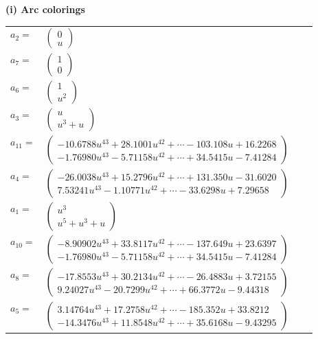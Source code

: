 \documentclass[1p]{elsarticle_modified}
\theoremstyle{definition}
\begin{document}
\flushleft \textbf{(i) Arc colorings}\\
\begin{tabular}{m{7pt} m{180pt} m{7pt} m{180pt} }
\flushright $a_{2}=$&$\begin{pmatrix}0\\u\end{pmatrix}$ \\
\flushright $a_{7}=$&$\begin{pmatrix}1\\0\end{pmatrix}$ \\
\flushright $a_{6}=$&$\begin{pmatrix}1\\u^2\end{pmatrix}$ \\
\flushright $a_{3}=$&$\begin{pmatrix}u\\u^3+u\end{pmatrix}$ \\
\flushright $a_{11}=$&$\begin{pmatrix}-10.6788 u^{43}+28.1001 u^{42}+\cdots-103.108 u+16.2268\\-1.76980 u^{43}-5.71158 u^{42}+\cdots+34.5415 u-7.41284\end{pmatrix}$ \\
\flushright $a_{4}=$&$\begin{pmatrix}-26.0038 u^{43}+15.2796 u^{42}+\cdots+131.350 u-31.6020\\7.53241 u^{43}-1.10771 u^{42}+\cdots-33.6298 u+7.29658\end{pmatrix}$ \\
\flushright $a_{1}=$&$\begin{pmatrix}u^3\\u^5+u^3+u\end{pmatrix}$ \\
\flushright $a_{10}=$&$\begin{pmatrix}-8.90902 u^{43}+33.8117 u^{42}+\cdots-137.649 u+23.6397\\-1.76980 u^{43}-5.71158 u^{42}+\cdots+34.5415 u-7.41284\end{pmatrix}$ \\
\flushright $a_{8}=$&$\begin{pmatrix}-17.8553 u^{43}+30.2134 u^{42}+\cdots-26.4883 u+3.72155\\9.24027 u^{43}-20.7299 u^{42}+\cdots+66.3772 u-9.44318\end{pmatrix}$ \\
\flushright $a_{5}=$&$\begin{pmatrix}3.14764 u^{43}+17.2758 u^{42}+\cdots-185.352 u+33.8212\\-14.3476 u^{43}+11.8548 u^{42}+\cdots+35.6168 u-9.43295\end{pmatrix}$ \\

\end{tabular}
\end{document}

